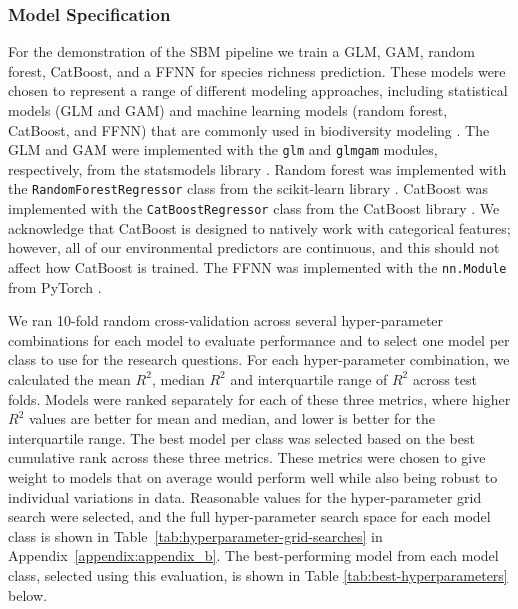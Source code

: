 \subsubsection{Model Specification}\label{subsubsec:models_spefication}
For the demonstration of the SBM pipeline we train a GLM, GAM, random forest, CatBoost, and a FFNN for species richness prediction. These models were chosen to represent a range of different modeling approaches, including statistical models (GLM and GAM) and machine learning models (random forest, CatBoost, and FFNN) that are commonly used in biodiversity modeling \parencite{olaya-marin_comparison_2013, mondal2021, andermann2022, brugere2023, cai2023, ngor2023, baggstrom2025}. The GLM and GAM were implemented with the \texttt{glm} and \texttt{glmgam} modules, respectively, from the statsmodels library \parencite{seabold2010statsmodels}. Random forest was implemented with the \texttt{RandomForestRegressor} class from the scikit-learn library \parencite{scikit-learn}. CatBoost was implemented with the \texttt{CatBoostRegressor} class from the CatBoost library \parencite{catboostdocs2026}. We acknowledge that CatBoost is designed to natively work with categorical features; however, all of our environmental predictors are continuous, and this should not affect how CatBoost is trained. The FFNN was implemented with the \texttt{nn.Module} from PyTorch \parencite{pytorchdocs2026}. 

We ran 10-fold random cross-validation across several hyper-parameter combinations for each model to evaluate performance and to select one model per class to use for the research questions. For each hyper-parameter combination, we calculated the mean \(R^2\), median \(R^2\) and interquartile range of \(R^2\) across test folds. Models were ranked separately for each of these three metrics, where higher \(R^2\) values are better for mean and median, and lower is better for the interquartile range. The best model per class was selected based on the best cumulative rank across these three metrics. These metrics were chosen to give weight to models that on average would perform well while also being robust to individual variations in data. Reasonable values for the hyper-parameter grid search were selected, and the full hyper-parameter search space for each model class is shown in Table~\ref{tab:hyperparameter-grid-searches} in Appendix~\ref{appendix:appendix_b}. The best-performing model from each model class, selected using this evaluation, is shown in Table \ref{tab:best-hyperparameters} below. 


